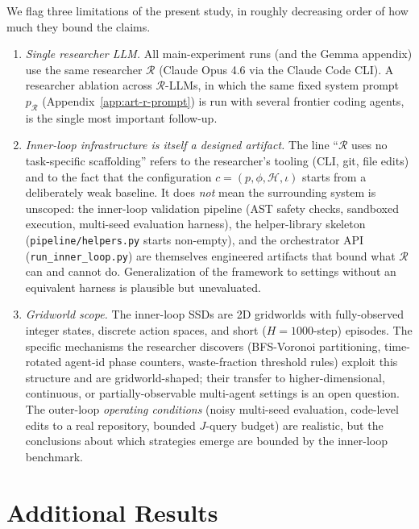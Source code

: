 \documentclass{article}
\newcommand{\cR}{\mathcal{R}}
\begin{document}
We flag three limitations of the present study, in roughly decreasing order of how much they bound the claims.

\begin{enumerate}[leftmargin=*]
  \item \emph{Single researcher LLM.} All main-experiment runs (and the Gemma appendix) use the same researcher $\cR$ (Claude Opus 4.6 via the Claude Code CLI). A researcher ablation across $\cR$-LLMs, in which the same fixed system prompt $p_\cR$ (Appendix~\ref{app:art-r-prompt}) is run with several frontier coding agents, is the single most important follow-up.
  \item \emph{Inner-loop infrastructure is itself a designed artifact.} The line ``$\cR$ uses no task-specific scaffolding'' refers to the researcher's tooling (CLI, git, file edits) and to the fact that the configuration $c{=}(p,\phi,\mathcal{H},\iota)$ starts from a deliberately weak baseline. It does \emph{not} mean the surrounding system is unscoped: the inner-loop validation pipeline (AST safety checks, sandboxed execution, multi-seed evaluation harness), the helper-library skeleton (\texttt{pipeline/helpers.py} starts non-empty), and the orchestrator API (\texttt{run\_inner\_loop.py}) are themselves engineered artifacts that bound what $\cR$ can and cannot do. Generalization of the framework to settings without an equivalent harness is plausible but unevaluated.
  \item \emph{Gridworld scope.} The inner-loop SSDs are 2D gridworlds with fully-observed integer states, discrete action spaces, and short ($H{=}1000$-step) episodes. The specific mechanisms the researcher discovers (BFS-Voronoi partitioning, time-rotated agent-id phase counters, waste-fraction threshold rules) exploit this structure and are gridworld-shaped; their transfer to higher-dimensional, continuous, or partially-observable multi-agent settings is an open question. The outer-loop \emph{operating conditions} (noisy multi-seed evaluation, code-level edits to a real repository, bounded $J$-query budget) are realistic, but the conclusions about which strategies emerge are bounded by the inner-loop benchmark.
\end{enumerate}


\section{Additional Results}
\label{app:additional}
\end{document}
